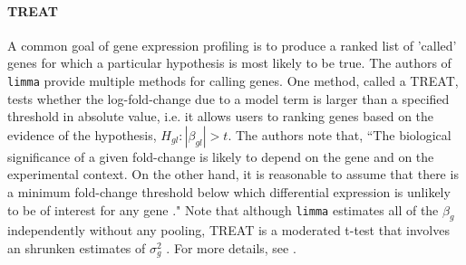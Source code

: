 \begin{itemize}
\paragraph{TREAT}
A common goal of gene expression profiling is to produce a ranked list of 'called' genes for which a particular hypothesis is most likely to be true. The authors of \texttt{limma} provide multiple methods for calling genes. One method, called a TREAT, tests whether the log-fold-change due to a model term is larger than a specified threshold in absolute value, i.e. it allows users to ranking genes based on the evidence of the hypothesis, $H_{gl}:|\beta_{gl}|>t$. The authors note that, ``The biological significance of a given fold-change is likely to depend on the gene and on the experimental context. On the other hand, it is reasonable to assume that there is a minimum fold-change threshold below which differential expression is unlikely to be of interest for any gene \citep[pp. 765-755]{treat}." Note that although \texttt{limma} estimates all of the $\beta_g$ independently without any pooling, TREAT is a moderated t-test that involves an shrunken estimates of $\sigma^2_g$ \citep{treat}. For more details, see \citet{treat}.


\end{itemize}
